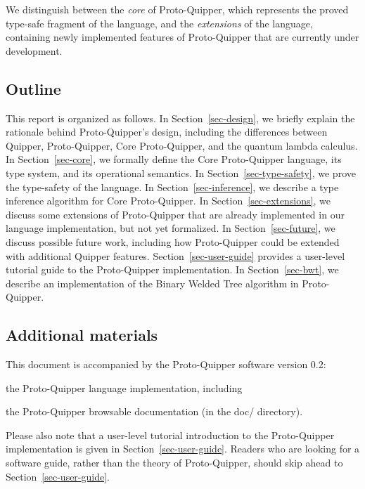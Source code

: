 \documentclass[twoside]{article}
\begin{document}
We distinguish between the \emph{core} of Proto-Quipper, which 
represents the proved type-safe fragment of the language, and 
the \emph{extensions} of the language, containing newly 
implemented features of Proto-Quipper that are currently under 
development. 

\subsection{Outline}

This report is organized as follows. In Section~\ref{sec-design}, we
briefly explain the rationale behind Proto-Quipper's design, including
the differences between Quipper, Proto-Quipper, Core Proto-Quipper,
and the quantum lambda calculus. In Section~\ref{sec-core}, we
formally define the Core Proto-Quipper language, its type system, and
its operational semantics. In Section~\ref{sec-type-safety}, we prove
the type-safety of the language. In Section~\ref{sec-inference}, we
describe a type inference algorithm for Core Proto-Quipper. In
Section~\ref{sec-extensions}, we discuss some extensions of
Proto-Quipper that are already implemented in our language
implementation, but not yet formalized. In Section~\ref{sec-future},
we discuss possible future work, including how Proto-Quipper could be
extended with additional Quipper features.
Section~\ref{sec-user-guide} provides a user-level tutorial guide to
the Proto-Quipper implementation.
In Section~\ref{sec-bwt}, we describe an implementation of the Binary
Welded Tree algorithm in Proto-Quipper.

\subsection{Additional materials}

This document is accompanied by the Proto-Quipper software version
0.2:
\begin{compactitemize}
\item the Proto-Quipper language implementation, including
\item the Proto-Quipper browsable documentation (in the doc/ directory).
\end{compactitemize}

Please also note that a user-level tutorial introduction to the
Proto-Quipper implementation is given in
Section~\ref{sec-user-guide}. Readers who are looking for a software
guide, rather than the theory of Proto-Quipper, should skip ahead to
Section~\ref{sec-user-guide}.
\end{document}
